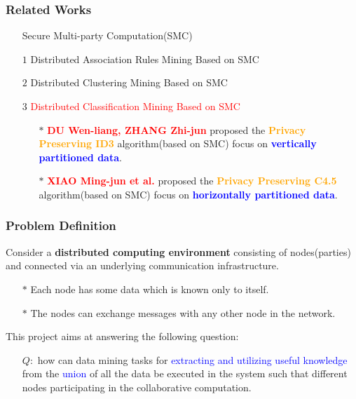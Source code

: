\documentclass{beamer} %
\newcommand{\blue}[1]{\textcolor{blue}{#1}}
\newcommand{\red}[1]{\textcolor{red}{#1}}
\newcommand{\orange}[1]{\textcolor{orange}{#1}}
\begin{document}

\begin{frame}
\frametitle{Related Works}
\begin{itemize} \itemsep2pt \parskip0pt 
    \item[] Secure Multi-party Computation(SMC)
    \item[$1$] Distributed Association Rules Mining Based on SMC
    \item[$2$] Distributed Clustering Mining Based on SMC
    \item[$3$] \red{Distributed Classification Mining Based on SMC}
    \begin{itemize} \itemsep2pt \parskip0pt 
        \item[$\ast$] \red{\bf DU Wen-liang, ZHANG Zhi-jun} proposed the \orange{\bf Privacy Preserving ID3} algorithm(based on SMC) focus on \blue{\bf vertically partitioned data}.
        \vspace{6mm}
        \item[$\ast$] \red{\bf XIAO Ming-jun et al.} proposed the \orange{\bf Privacy Preserving C4.5} algorithm(based on SMC) focus on \blue{\bf horizontally partitioned data}.
    \end{itemize}
\end{itemize}

\end{frame}




\begin{frame}
\frametitle{Problem Definition}
Consider a {\bf distributed computing environment} consisting of nodes(parties) and connected via an underlying communication infrastructure. 
\begin{itemize} \itemsep2pt \parskip0pt 
    \item[$\ast$] Each node has some data which is known only to itself.
    \item[$\ast$] The nodes can exchange messages with any other node in the network.
\end{itemize}

\vspace{6mm}
This project aims at answering the following question: 
\begin{itemize} \itemsep2pt \parskip0pt 
    \item[$Q:$] how can data mining tasks for \blue{extracting and utilizing useful knowledge} from the \blue{union} of all the data be executed in the system such that different nodes participating in the collaborative computation.
\end{itemize}


\end{frame}
\end{document}
